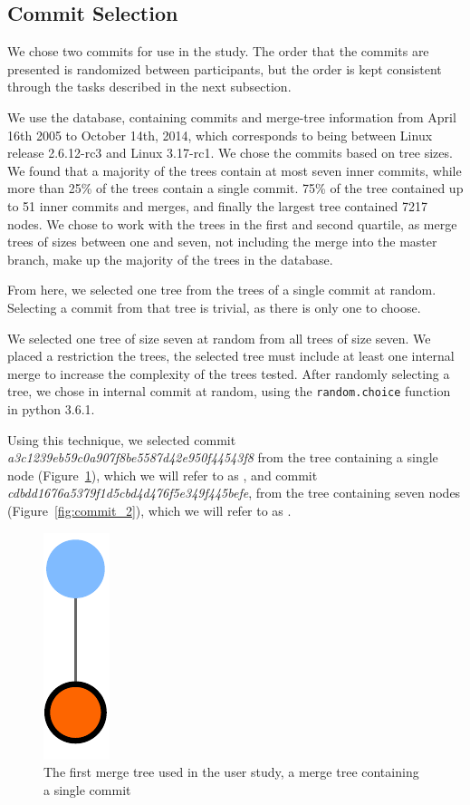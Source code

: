 \subsection{Commit Selection}
\label{sub:commit_selection}

We chose two commits for use in the study. The order that the commits
are presented is randomized between participants, but the order is kept
consistent through the tasks described in the next subsection.

We use the \tool database, containing commits and merge-tree information
from April 16th 2005 to October 14th, 2014, which corresponds to being
between Linux release 2.6.12-rc3 and Linux 3.17-rc1.  We chose the commits based on tree sizes. We
found that a majority of the trees contain at most seven inner commits,
while more than 25\% of the trees contain a single commit. 75\% of the
tree contained up to 51 inner commits and merges, and finally the
largest tree contained 7217 nodes. We chose to work with the trees in
the first and second quartile, as merge trees of sizes between one and
seven, not including the merge into the master branch, make up the
majority of the trees in the database.

From here, we selected one tree from the trees of a single commit at
random. Selecting a commit from that tree is trivial, as there is only
one to choose.

We selected one tree of size seven at random from all trees of size
seven. We placed a restriction the trees, the selected tree must include
at least one internal merge to increase the complexity of the trees
tested. After randomly selecting a tree, we chose in internal commit at
random, using the \verb|random.choice| function in python 3.6.1.


Using this technique, we selected commit
\emph{a3c1239eb59c0a907f8be5587d42e950f44543f8} from the tree containing
a single node (Figure~\ref{fig:commit_1}), which we will refer to as
\comA, and commit \emph{cdbdd1676a5379f1d5cbd4d476f5e349f445befe}, from
the tree containing seven nodes (Figure~\ref{fig:commit_2}), which we
will refer to as \comB.

\begin{figure}[bpt]
  \centering
  \includegraphics[width=0.08\linewidth]{figures/commits/1-commit.pdf}
  \caption{The first merge tree used in the user study, a merge tree
    containing a single commit}
  \label{fig:commit_1}
\end{figure}


